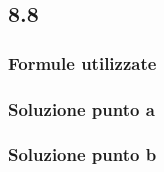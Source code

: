 \documentclass[../../main.tex]{subfiles}
\begin{document}
\subsection*{8.8}
\subsubsection*{Formule utilizzate}
\subsubsection*{Soluzione punto a}
\subsubsection*{Soluzione punto b}
\newpage
\end{document}

